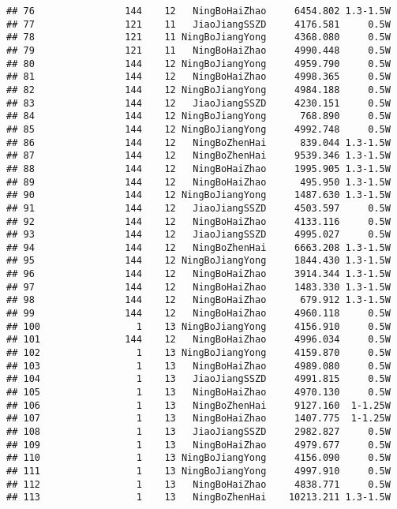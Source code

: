 \documentclass[]{article}
\begin{document}
\begin{verbatim}
## 76                144    12   NingBoHaiZhao     6454.802 1.3-1.5W
## 77                121    11   JiaoJiangSSZD     4176.581     0.5W
## 78                121    11 NingBoJiangYong     4368.080     0.5W
## 79                121    11   NingBoHaiZhao     4990.448     0.5W
## 80                144    12 NingBoJiangYong     4959.790     0.5W
## 81                144    12   NingBoHaiZhao     4998.365     0.5W
## 82                144    12 NingBoJiangYong     4984.188     0.5W
## 83                144    12   JiaoJiangSSZD     4230.151     0.5W
## 84                144    12 NingBoJiangYong      768.890     0.5W
## 85                144    12 NingBoJiangYong     4992.748     0.5W
## 86                144    12   NingBoZhenHai      839.044 1.3-1.5W
## 87                144    12   NingBoZhenHai     9539.346 1.3-1.5W
## 88                144    12   NingBoHaiZhao     1995.905 1.3-1.5W
## 89                144    12   NingBoHaiZhao      495.950 1.3-1.5W
## 90                144    12 NingBoJiangYong     1487.630 1.3-1.5W
## 91                144    12   JiaoJiangSSZD     4503.597     0.5W
## 92                144    12   NingBoHaiZhao     4133.116     0.5W
## 93                144    12   JiaoJiangSSZD     4995.027     0.5W
## 94                144    12   NingBoZhenHai     6663.208 1.3-1.5W
## 95                144    12 NingBoJiangYong     1844.430 1.3-1.5W
## 96                144    12   NingBoHaiZhao     3914.344 1.3-1.5W
## 97                144    12   NingBoHaiZhao     1483.330 1.3-1.5W
## 98                144    12   NingBoHaiZhao      679.912 1.3-1.5W
## 99                144    12   NingBoHaiZhao     4960.118     0.5W
## 100                 1    13 NingBoJiangYong     4156.910     0.5W
## 101               144    12   NingBoHaiZhao     4996.034     0.5W
## 102                 1    13 NingBoJiangYong     4159.870     0.5W
## 103                 1    13   NingBoHaiZhao     4989.080     0.5W
## 104                 1    13   JiaoJiangSSZD     4991.815     0.5W
## 105                 1    13   NingBoHaiZhao     4970.130     0.5W
## 106                 1    13   NingBoZhenHai     9127.160  1-1.25W
## 107                 1    13   NingBoHaiZhao     1407.775  1-1.25W
## 108                 1    13   JiaoJiangSSZD     2982.827     0.5W
## 109                 1    13   NingBoHaiZhao     4979.677     0.5W
## 110                 1    13 NingBoJiangYong     4156.090     0.5W
## 111                 1    13 NingBoJiangYong     4997.910     0.5W
## 112                 1    13   NingBoHaiZhao     4838.771     0.5W
## 113                 1    13   NingBoZhenHai    10213.211 1.3-1.5W

\end{verbatim}
\end{document}
